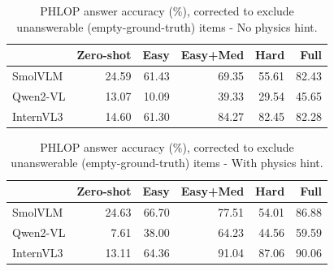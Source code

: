 \begin{table}
\caption{PHLOP answer accuracy (\%), corrected to exclude unanswerable (empty-ground-truth) items - No physics hint.}
\label{tab:phlop_acc_no_physics}
\begin{tabular}{lrrrrr}
\toprule
 & Zero-shot & Easy & Easy+Med & Hard & Full \\
\midrule
SmolVLM & 24.59 & 61.43 & 69.35 & 55.61 & 82.43 \\
Qwen2-VL & 13.07 & 10.09 & 39.33 & 29.54 & 45.65 \\
InternVL3 & 14.60 & 61.30 & 84.27 & 82.45 & 82.28 \\
\bottomrule
\end{tabular}
\end{table}


\begin{table}
\caption{PHLOP answer accuracy (\%), corrected to exclude unanswerable (empty-ground-truth) items - With physics hint.}
\label{tab:phlop_acc_with_physics}
\begin{tabular}{lrrrrr}
\toprule
 & Zero-shot & Easy & Easy+Med & Hard & Full \\
\midrule
SmolVLM & 24.63 & 66.70 & 77.51 & 54.01 & 86.88 \\
Qwen2-VL & 7.61 & 38.00 & 64.23 & 44.56 & 59.59 \\
InternVL3 & 13.11 & 64.36 & 91.04 & 87.06 & 90.06 \\
\bottomrule
\end{tabular}
\end{table}
